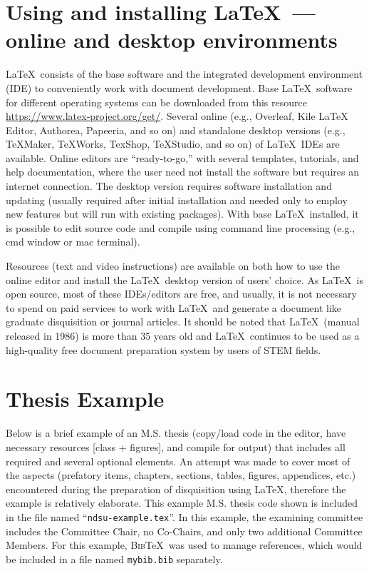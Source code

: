 \documentclass{article}
\begin{document}
\section{Using and installing \LaTeX\  --- online and desktop environments}  

\LaTeX\ consists of the base software and the integrated development environment (IDE) to conveniently work with document development. Base \LaTeX\ software for different operating systems can be downloaded from this resource \url{https://www.latex-project.org/get/}. Several online (e.g., Overleaf, Kile LaTeX Editor, Authorea, Papeeria, and so on) and standalone desktop versions (e.g., TeXMaker, TeXWorks, TexShop, TeXStudio, and so on) of \LaTeX\ IDEs are available. Online editors are ``ready-to-go,'' with several templates, tutorials, and help documentation, where the user need not install the software but requires an internet connection. The desktop version requires software installation and updating (usually required after initial installation and needed only to employ new features but will run with existing packages). With base \LaTeX\ installed, it is possible to edit source code and compile using command line processing (e.g., cmd window or mac terminal).   

Resources (text and video instructions) are available on both how to use the online editor and install the \LaTeX\ desktop version of users' choice. As \LaTeX\ is open source, most of these IDEs/editors are free, and usually, it is not necessary to spend on paid services to work with \LaTeX\ and generate a document like graduate disquisition or journal articles. It should be noted that \LaTeX\ (manual released in 1986) is more than 35 years old and \LaTeX\ continues to be used as a high-quality free document preparation system by users of STEM fields.

\section{Thesis Example}\label{example}
Below is a brief example of an M.S. thesis (copy/load code in the editor, have necessary resources [class + figures], and compile for output) that includes all required and several optional elements. An attempt was made to cover most of the aspects (prefatory items, chapters, sections, tables, figures, appendices, etc.) encountered during the preparation of disquisition using \LaTeX, therefore the example is relatively elaborate. This example M.S. thesis code shown is included in the file named ``\texttt{ndsu-example.tex}''. In this example, the examining committee includes the Committee Chair, no Co-Chairs, and only two additional Committee Members. For this example, \textsc{Bib}\TeX\ was used to manage references, which would be included in a file named \texttt{mybib.bib} separately.
\end{document}
